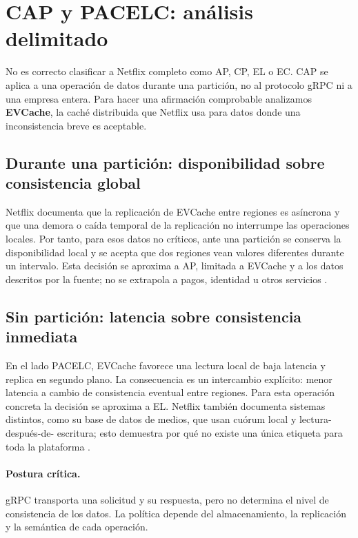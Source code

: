 \section{CAP y PACELC: análisis delimitado}

No es correcto clasificar a Netflix completo como AP, CP, EL o EC. CAP se
aplica a una operación de datos durante una partición, no al protocolo gRPC ni
a una empresa entera. Para hacer una afirmación comprobable analizamos
\textbf{EVCache}, la caché distribuida que Netflix usa para datos donde una
inconsistencia breve es aceptable.

\subsection{Durante una partición: disponibilidad sobre consistencia global}
Netflix documenta que la replicación de EVCache entre regiones es asíncrona y
que una demora o caída temporal de la replicación no interrumpe las operaciones
locales. Por tanto, para esos datos no críticos, ante una partición se conserva
la disponibilidad local y se acepta que dos regiones vean valores diferentes
durante un intervalo. Esta decisión se aproxima a AP, limitada a EVCache y a
los datos descritos por la fuente; no se extrapola a pagos, identidad u otros
servicios \cite{netflix-evcache}.

\subsection{Sin partición: latencia sobre consistencia inmediata}
En el lado PACELC, EVCache favorece una lectura local de baja latencia y replica
en segundo plano. La consecuencia es un intercambio explícito: menor latencia
a cambio de consistencia eventual entre regiones. Para esta operación concreta
la decisión se aproxima a EL. Netflix también documenta sistemas distintos,
como su base de datos de medios, que usan cuórum local y lectura-después-de-
escritura; esto demuestra por qué no existe una única etiqueta para toda la
plataforma \cite{netflix-evcache,netflix-media-db}.

\paragraph{Postura crítica.} gRPC transporta una solicitud y su respuesta, pero
no determina el nivel de consistencia de los datos. La política depende del
almacenamiento, la replicación y la semántica de cada operación.
